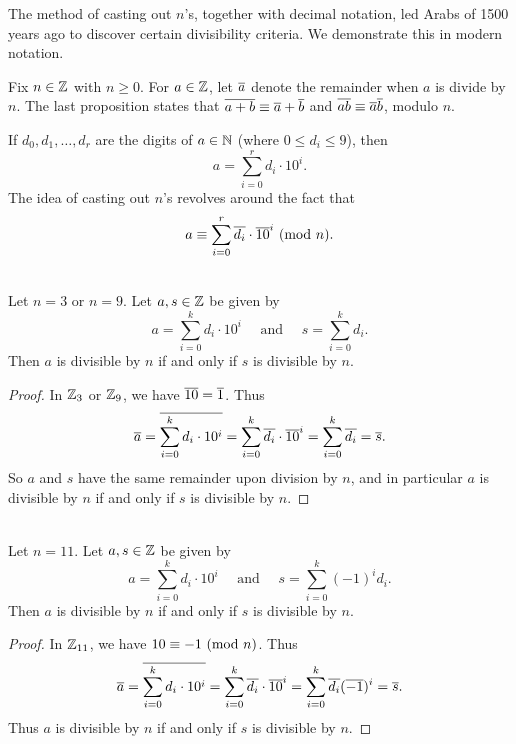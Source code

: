 \documentclass{amsart}
\begin{document}
The method of casting out $n$'s, together with decimal notation,
led Arabs of 1500 years ago to discover certain divisibility criteria.
We demonstrate this in modern notation.

Fix $n \in \mathbb{Z}$ with $n \ge 0$.  For $a \in \mathbb{Z}$, let $\overline{a}$ denote the remainder when
$a$ is divide by $n$.  The last proposition states that $\overline{a+b} \equiv \overline{a} + \overline{b}$
and $\overline{ab} \equiv \overline{a} \overline{b}$, modulo $n$.

If $d_0,d_1, \dots, d_r$ are the digits of $a \in \mathbb{N}$ (where $0 \le d_i \le 9$), then
\[ a = \sum_{i=0}^r d_i \cdot 10^i . \]
The idea of casting out $n$'s revolves around the fact that
\[ a \equiv \sum_{i=0}^r \overline{d_i} \cdot \overline{10}^i \text{\rm{ (mod }}{n}\text{\rm{)}} . \]

\begin{Prop}
 \\
Let $n = 3$ or $n = 9$.  Let $a,s \in \mathbb{Z}$ be given by
\[ a = \sum_{i=0}^{k} d_i \cdot 10^i \quad \text{ and } \quad s = \sum_{i=0}^k d_i . \]
Then $a$ is divisible by $n$ if and only if $s$ is divisible by $n$.
\end{Prop}

\begin{proof}
In $\mathbb{Z}_3$ or $\mathbb{Z}_9$, we have $\overline{10} = \overline{1}$.
Thus
\[ \overline{a} = \overline{\sum_{i=0}^k d_i \cdot 10^i}
    = \sum_{i=0}^k \overline{d_i} \cdot \overline{10}^i \\
    = \sum_{i=0}^k \overline{d_i}
    = \overline{s}. \]
So $a$ and $s$ have the same remainder upon division by $n$,
and in particular $a$ is divisible by $n$ if and only if $s$ is
divisible by $n$.
\end{proof}

\begin{Prop}
 \\
Let $n = 11$.  Let $a,s \in \mathbb{Z}$ be given by
\[ a = \sum_{i=0}^{k} d_i \cdot 10^i \quad \text{ and } \quad s = \sum_{i=0}^k (-1)^i d_i . \]
Then $a$ is divisible by $n$ if and only if $s$ is divisible by $n$.
\end{Prop}

\begin{proof}
In $\mathbb{Z}_{11}$, we have $10 \equiv -1 \text{\rm{ (mod }}{n}\text{\rm{)}}$.
Thus
\[ \overline{a} = \overline{\sum_{i=0}^k d_i \cdot 10^i}
    = \sum_{i=0}^k \overline{d_i} \cdot \overline{10}^i
    = \sum_{i=0}^k \overline{d_i} (\overline{-1})^i \\
    = \overline{s}. \]
Thus $a$ is divisible by $n$ if and only if $s$ is divisible by $n$.
\end{proof}
\end{document}
